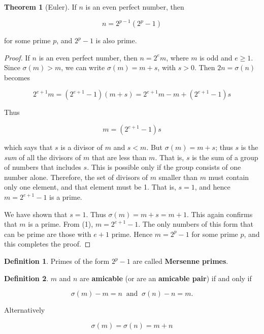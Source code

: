 \documentclass{article}
\theoremstyle{definition} %
\newtheorem{theorem}{Theorem}[section] %
\theoremstyle{definition}
\theoremstyle{definition}
\theoremstyle{definition}
\newtheorem{definition}{Definition}[section]
\begin{document}
  \begin{theorem}[Euler]
    If $n$ is an even perfect number, then
    
    \[ n = 2^{p - 1}(2^p - 1) \]
    
    for some prime $p$, and $2^p - 1$ is also prime.
  \end{theorem}
  
  \begin{proof}
    If $n$ is an even perfect number, then $n = 2^em$, where $m$ is odd
    and $e \geq 1$. Since $\sigma(m) > m$, we can write $\sigma(m) = m + s$,
    with $s > 0$. Then $2n = \sigma(n)$ becomes
    
    \[ 2^{e + 1}m = (2^{e + 1} - 1)(m + s) = 2^{e + 1}m - m + (2^{e + 1} - 1)s \]
    
    Thus
    
    \begin{equation}
      m = (2^{e + 1} - 1)s
    \end{equation}
    
    which says that $s$ is a divisor of $m$ and $s < m$. But $\sigma(m) = m + s$;
    thus $s$ is the \textit{sum} of all the divisors of $m$ that are less than $m$. That is,
    $s$ is the sum of a group of numbers that includes $s$. This is possible only if the
    group consists of one number alone. Therefore, the set of divisors of $m$ smaller
    than $m$ must contain only one element, and that element must be 1. That is,
    $s = 1$, and hence $m = 2^{e+1} - 1$ is a prime.
    
    We have shown that $s = 1$. Thus $\sigma(m) = m + s = m + 1$. This again confirms
    that $m$ is a prime. From (1), $m = 2^{e + 1} - 1$. The only numbers of this form that
    can be prime are those with $e + 1$ prime. Hence $m = 2^p - 1$ for some prime $p$,
    and this completes the proof.
  \end{proof}
  
  \begin{definition}
    Primes of the form $2^p - 1$ are called \textbf{Mersenne primes}.
  \end{definition}
  
  \begin{definition}
    $m$ and $n$ are \textbf{amicable} (or are an \textbf{amicable pair}) if and only if
    
    \[ \sigma(m) - m = n \;\;\text{and}\;\; \sigma(n) - n = m. \]
    
    Alternatively
    
    \[ \sigma(m) = \sigma(n) = m + n \]
  \end{definition}
  
\end{document}
